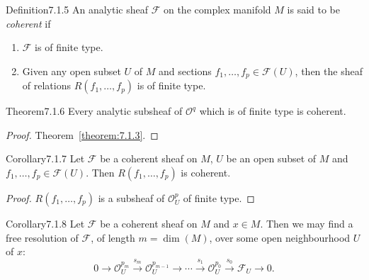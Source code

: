 \begin{originaltheorem}{Definition}{7.1.5}
An analytic sheaf $\mathcal{F}$ on the complex manifold $M$ is said to be \emph{coherent} if
\begin{enumerate}[label=\alph*)]
\item $\mathcal{F}$ is of finite type.
\item Given any open subset $U$ of $M$ and sections $f_1,\ldots,f_p\in\mathcal{F}(U)$, then the sheaf of relations $R(f_1,\ldots,f_p)$ is of finite type.
\end{enumerate}
\end{originaltheorem}
\begin{originaltheorem}{Theorem}{7.1.6}
Every analytic subsheaf of $\mathcal{O}^q$ which is of finite type is coherent.
\end{originaltheorem}
\begin{proof}Theorem~\ref{theorem:7.1.3}.\end{proof}
\begin{originaltheorem}{Corollary}{7.1.7}
Let $\mathcal{F}$ be a coherent sheaf on $M$, $U$ be an open subset of $M$ and $f_1,\ldots,f_p\in\mathcal{F}(U)$. Then $R(f_1,\ldots,f_p)$ is coherent.
\end{originaltheorem}
\begin{proof}$R(f_1,\ldots,f_p)$ is a subsheaf of $\mathcal{O}_U^p$ of finite type.\end{proof}
\begin{originaltheorem}{Corollary}{7.1.8}
Let $\mathcal{F}$ be a coherent sheaf on $M$ and $x\in M$. Then we may find a free resolution of $\mathcal{F}$, of length $m=\dim(M)$, over some open neighbourhood $U$ of $x$:
\[
0\to\mathcal{O}_U^{p_m}\xrightarrow{s_m}\mathcal{O}_U^{p_{m-1}}\to\cdots\xrightarrow{s_1}\mathcal{O}_U^{p_0}\xrightarrow{s_0}\mathcal{F}_U\to0.
\]
\end{originaltheorem}
